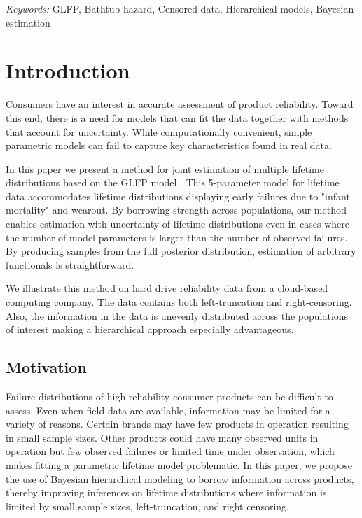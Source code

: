 \documentclass[12pt]{article}
\begin{document}
\noindent%
{\it Keywords:} GLFP, Bathtub hazard, Censored data, Hierarchical models, Bayesian estimation
\vfill

\newpage
\tableofcontents
\newpage
{} %
\section{Introduction}
Consumers have an interest in accurate assessment of product reliability. Toward this end, there is a need for models that can fit the data together with methods that account for uncertainty.  While computationally convenient, simple parametric models can fail to capture key characteristics found in real data.

In this paper we present a method for joint estimation of multiple lifetime distributions based on the GLFP model \citep{chan}. This 5-parameter model for lifetime data accommodates lifetime distributions displaying early failures due to "infant mortality" and wearout. By borrowing strength across populations, our method enables estimation with uncertainty of lifetime distributions even in cases where the number of model parameters is larger than the number of observed failures. By producing samples from the full posterior distribution, estimation of arbitrary functionals is straightforward.

We illustrate this method on hard drive reliability data from a cloud-based computing company.  The data contains both left-truncation and right-censoring.  Also, the information in the data is unevenly distributed across the populations of interest making a hierarchical approach especially advantageous. 

\subsection{Motivation}

Failure distributions of high-reliability consumer products can be difficult to assess.  Even when field data are available, information may be limited for a variety of reasons.  Certain brands may have few products in operation resulting in small sample sizes.  Other products could have many observed units in operation but few observed failures or limited time under observation, which makes fitting a parametric lifetime model problematic.  In this paper, we propose the use of Bayesian hierarchical modeling to borrow information across products, thereby improving inferences on lifetime distributions where information is limited by small sample sizes, left-truncation, and right censoring. 
\end{document}
